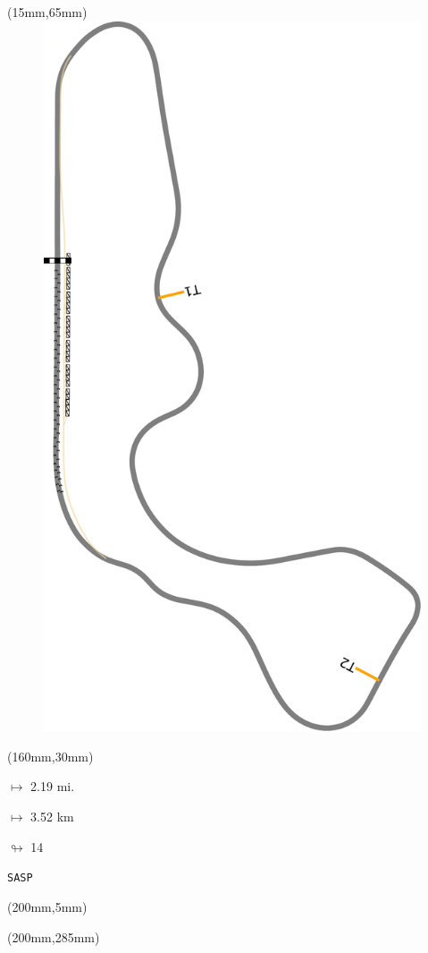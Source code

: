 \begin{textblock*}{185mm}(15mm,65mm)%
\centering
\mbox{\includegraphics[width=185mm,height=210mm,keepaspectratio]{PT/SASP.pdf}}
\end{textblock*}
\begin{textblock*}{40mm}(160mm,30mm)%
\Large
\par$\mapsto$ 2.19 mi.
\par$\mapsto$ 3.52 km
\par$\looparrowright$ 14
\par\hfill\tiny\tt SASP\\
\end{textblock*}
\begin{textblock*}{20mm}(200mm,5mm)%
\fbox{\thepage}
\label{SASP}
\end{textblock*}
\begin{textblock*}{20mm}(200mm,285mm)%
\fbox{\thepage}
\end{textblock*}

